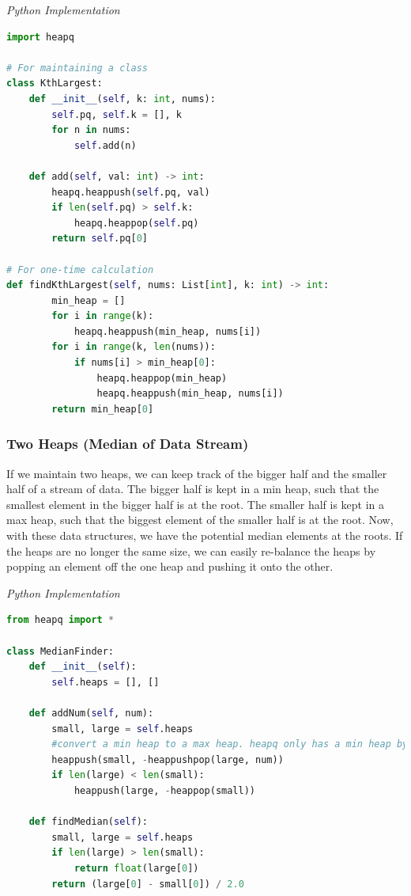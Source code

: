 \documentclass{article}
\begin{document}
\vspace{8pt} \emph{Python Implementation}
\begin{lstlisting}[language=Python]
import heapq

# For maintaining a class
class KthLargest:
    def __init__(self, k: int, nums):
        self.pq, self.k = [], k
        for n in nums:
            self.add(n)

    def add(self, val: int) -> int:
        heapq.heappush(self.pq, val)
        if len(self.pq) > self.k:
            heapq.heappop(self.pq)
        return self.pq[0]

# For one-time calculation
def findKthLargest(self, nums: List[int], k: int) -> int:
        min_heap = []
        for i in range(k):
            heapq.heappush(min_heap, nums[i])
        for i in range(k, len(nums)):
            if nums[i] > min_heap[0]:
                heapq.heappop(min_heap)
                heapq.heappush(min_heap, nums[i])
        return min_heap[0]
\end{lstlisting}

    
    \subsubsection{Two Heaps (Median of Data Stream)}
    If we maintain two heaps, we can keep track of the bigger half and the smaller half of a stream of data. The bigger half is kept in a min heap, such that the smallest element in the bigger half is at the root. The smaller half is kept in a max heap, such that the biggest element of the smaller half is at the root. Now, with these data structures, we have the potential median elements at the roots. If the heaps are no longer the same size, we can easily re-balance the heaps by popping an element off the one heap and pushing it onto the other.

\vspace{8pt} \emph{Python Implementation}
\begin{lstlisting}[language=Python]
from heapq import *

class MedianFinder:
    def __init__(self):
        self.heaps = [], []

    def addNum(self, num):
        small, large = self.heaps
        #convert a min heap to a max heap. heapq only has a min heap by default.
        heappush(small, -heappushpop(large, num))
        if len(large) < len(small):
            heappush(large, -heappop(small))

    def findMedian(self):
        small, large = self.heaps
        if len(large) > len(small):
            return float(large[0])
        return (large[0] - small[0]) / 2.0
\end{lstlisting}
\end{document}
